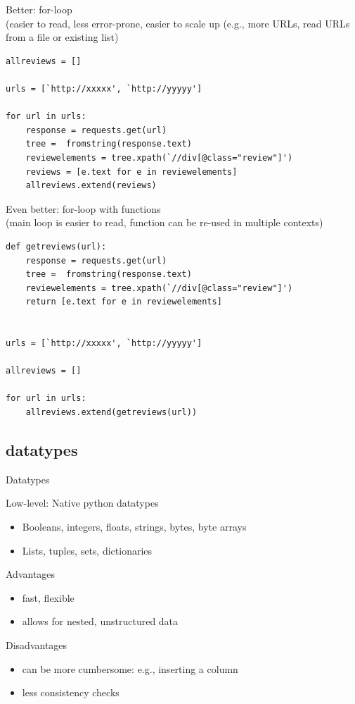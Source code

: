 \documentclass[compress]{beamer}
\begin{document}
\begin{frame}
Better: for-loop\\ (easier to read, less error-prone, easier to scale up (e.g., more URLs, read URLs from a file or existing list)
\begin{lstlisting}
allreviews = []

urls = [`http://xxxxx', `http://yyyyy']

for url in urls:
    response = requests.get(url)
    tree =  fromstring(response.text)
    reviewelements = tree.xpath(`//div[@class="review"]')
    reviews = [e.text for e in reviewelements]
    allreviews.extend(reviews)
\end{lstlisting}
\end{frame}


\begin{frame}
Even better: for-loop with functions\\ (main loop is easier to read, function can be re-used in multiple contexts)
\begin{lstlisting}
def getreviews(url):
    response = requests.get(url)
    tree =  fromstring(response.text)
    reviewelements = tree.xpath(`//div[@class="review"]')
    return [e.text for e in reviewelements]


urls = [`http://xxxxx', `http://yyyyy']

allreviews = []

for url in urls:
    allreviews.extend(getreviews(url))
\end{lstlisting}
\end{frame}


\subsection{datatypes}
\begin{frame}{Datatypes}
\begin{block}{Low-level: Native python datatypes}
	\begin{itemize}[<+->]
		\item Booleans, integers, floats, strings, bytes, byte arrays
		\item Lists, tuples, sets, dictionaries
	\end{itemize}
\end{block}
\pause
\begin{exampleblock}{Advantages }
	\begin{itemize}[<+->]
		\item fast, flexible
		\item allows for nested, unstructured data 
	\end{itemize}
\end{exampleblock}
\pause
\begin{alertblock}{Disadvantages }
	\begin{itemize}[<+->]
		\item can be more cumbersome: e.g., inserting a column
		\item less consistency checks
	\end{itemize}
\end{alertblock}
\end{frame}
\end{document}
